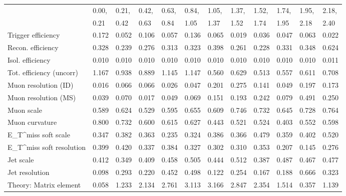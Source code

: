 \begin{tabular}{l|p{0.6cm}p{0.6cm}p{0.6cm}p{0.6cm}p{0.6cm}p{0.6cm}p{0.6cm}p{0.6cm}p{0.6cm}p{0.6cm}p{0.6cm}}
\hline
   & 0.00, & 0.21, & 0.42, & 0.63, & 0.84, & 1.05, & 1.37, & 1.52, & 1.74, & 1.95, & 2.18,  \\ 
   & 0.21 & 0.42 & 0.63 & 0.84 & 1.05 & 1.37 & 1.52 & 1.74 & 1.95 & 2.18 & 2.40  \\ 
\hline
Trigger efficiency                       & 0.172 & 0.052 & 0.106 & 0.057 & 0.136 & 0.065 & 0.019 & 0.036 & 0.047 & 0.063 & 0.022 \\
Recon. efficiency                        & 0.328 & 0.239 & 0.276 & 0.313 & 0.323 & 0.398 & 0.261 & 0.228 & 0.331 & 0.348 & 0.624 \\
Isol. efficiency                         & 0.010 & 0.010 & 0.010 & 0.010 & 0.010 & 0.010 & 0.010 & 0.010 & 0.010 & 0.010 & 0.011 \\
Tot. efficiency (uncorr)                 & 1.167 & 0.938 & 0.889 & 1.145 & 1.147 & 0.560 & 0.629 & 0.513 & 0.557 & 0.611 & 0.708 \\
Muon resolution (ID)                     & 0.016 & 0.066 & 0.066 & 0.026 & 0.047 & 0.201 & 0.275 & 0.141 & 0.049 & 0.197 & 0.173 \\
Muon resolution (MS)                     & 0.039 & 0.070 & 0.017 & 0.049 & 0.069 & 0.151 & 0.193 & 0.242 & 0.079 & 0.491 & 0.250 \\
Muon scale                               & 0.589 & 0.624 & 0.529 & 0.595 & 0.655 & 0.609 & 0.746 & 0.732 & 0.645 & 0.728 & 0.764 \\
Muon curvature                           & 0.800 & 0.732 & 0.600 & 0.615 & 0.627 & 0.443 & 0.521 & 0.524 & 0.403 & 0.552 & 0.598 \\
E_{T}^{miss} soft scale                  & 0.347 & 0.382 & 0.363 & 0.235 & 0.324 & 0.386 & 0.366 & 0.479 & 0.359 & 0.402 & 0.520 \\
E_{T}^{miss} soft resolution             & 0.399 & 0.420 & 0.337 & 0.384 & 0.327 & 0.302 & 0.310 & 0.353 & 0.207 & 0.145 & 0.276 \\
Jet scale                                & 0.412 & 0.349 & 0.409 & 0.458 & 0.505 & 0.444 & 0.512 & 0.387 & 0.487 & 0.467 & 0.477 \\
Jet resolution                           & 0.098 & 0.293 & 0.220 & 0.452 & 0.498 & 0.122 & 0.254 & 0.167 & 0.188 & 0.666 & 0.323 \\
Theory: Matrix element                   & 0.058 & 1.233 & 2.134 & 2.761 & 3.113 & 3.166 & 2.847 & 2.354 & 1.514 & 0.357 & 1.139 \\

\end{tabular}
